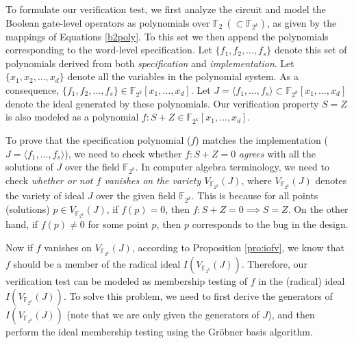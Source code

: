 To formulate our verification test, we first analyze the circuit and
model the Boolean gate-level operators as polynomials over
$\mathbb{F}_2 ~(\subset \mathbb{F}_{2^k})$, as given by the
mappings of Equations \ref{b2poly}.  
To this set we then append the polynomials corresponding to the
word-level specification.  Let $\{f_1,f_2,\ldots,f_s\}$ denote this
set of polynomials derived from  both {\it specification} and {\it
  implementation}.  
Let $\{x_1,x_2,\ldots,x_d\}$ denote all the variables in the
polynomial system. As a consequence, $\{f_1,f_2,\ldots,f_s\}\in
\mathbb{F}_{2^k}[x_{1},\dots,x_{d}]$. Let $J = \langle f_1,
\dots,f_s\rangle \subset \mathbb{F}_{2^k}[x_{1},\dots,x_{d}]$ denote
the ideal generated by these polynomials. Our verification property
$S=Z$ is also modeled as a polynomial $f: S+Z \in
\mathbb{F}_{2^k}[x_{1},\dots,x_{d}]$. 

To prove that the specification polynomial ($f$) matches the
implementation ($J = \langle f_1, \dots, f_s\rangle$), we need to
check whether $f: S+Z=0$  {\it agrees} with all the solutions of $J$
over the field $\mathbb{F}_{2^k}$. In computer algebra terminology, we
need to check {\it whether or not $f$ vanishes on the variety
  $V_{\mathbb{F}_{2^k}}(J)$},  where $V_{\mathbb{F}_{2^k}}(J)$ denotes
the variety of ideal $J$ over the given field $\mathbb{F}_{2^k}$.
This is because for all points (solutions) $p \in
V_{\mathbb{F}_{2^k}}(J)$, if $f(p) = 0$, then $f: S + Z = 0 \implies S
=Z$. On the other hand, if $f(p) \neq 0$ for some point $p$, then $p$
corresponds to the bug in the design.  

Now if $f$ vanishes on $V_{\mathbb{F}_{2^k}}(J)$, according to
Proposition \ref{pro:iofv},  we know that $f$ should be a member of
the radical ideal $I(V_{\mathbb{F}_{2^k}}(J))$.  Therefore, our
verification test can be modeled as membership testing of $f$ in the
(radical) ideal $I(V_{\mathbb{F}_{2^k}}(J))$. To solve this problem,
we need to first derive the generators of $I(V_{\mathbb{F}_{2^k}}(J))$ 
(note that we are only given the generators of $J$), and then perform
the ideal membership testing using the Gr\"obner basis algorithm.  

